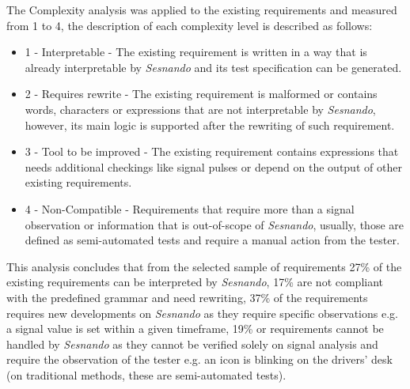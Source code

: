 The Complexity analysis was applied to the existing requirements and measured from 1 to 4, the description of each complexity level is described as follows:
\begin{itemize}
\item 1 - Interpretable - The existing requirement is written in a way that is already interpretable by \textit{Sesnando} and its test specification can be generated.
\item 2 - Requires rewrite - The existing requirement is malformed or contains words, characters or expressions that are not interpretable by \textit{Sesnando}, however, its main logic is supported after the rewriting of such requirement.
\item 3 - Tool to be improved - The existing requirement contains expressions that needs additional checkings like signal pulses or depend on the output of other existing requirements.
\item 4 - Non-Compatible - Requirements that require more than a signal observation or information that is out-of-scope of \textit{Sesnando}, usually, those are defined as semi-automated tests and require a manual action from the tester.
\end{itemize}

This analysis concludes that from the selected sample of requirements 27\% of the existing requirements can be interpreted by \textit{Sesnando}, 17\% are not compliant with the predefined grammar and need rewriting, 37\% of the requirements requires new developments on \textit{Sesnando} as they require specific observations e.g. a signal value is set within a given timeframe, 19\% or requirements cannot be handled by \textit{Sesnando} as they cannot be verified solely on signal analysis and require the observation of the tester e.g. an icon is blinking on the drivers' desk (on traditional methods, these are semi-automated tests).





